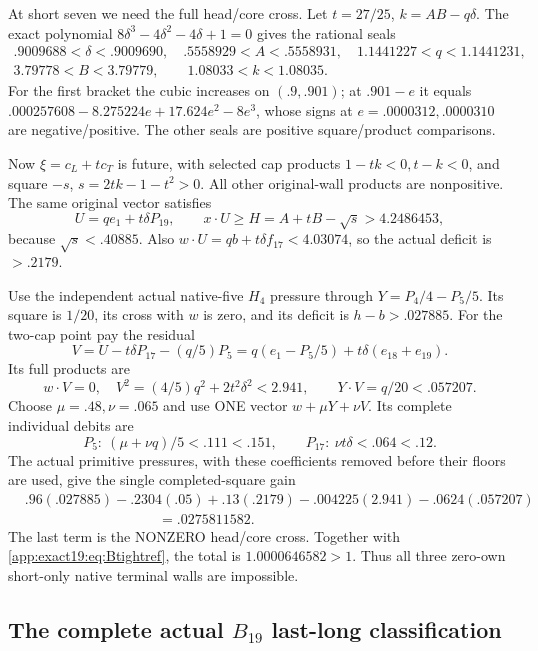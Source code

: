 \documentclass[11pt]{article}
\theoremstyle{definition}
\theoremstyle{remark}
\begin{document}
At short seven we need the full
head/core cross.
Let \(t=27/25\), \(k=AB-q\delta\).
The exact polynomial
\(8\delta^3-4\delta^2-4\delta+1=0\)
gives the rational seals
\[
\begin{gathered}
 .9009688<\delta<.9009690,\quad
 .5558929<A<.5558931,\quad
 1.1441227<q<1.1441231,\\
 3.79778<B<3.79779,\qquad1.08033<k<1.08035 .
\end{gathered}
\]
For the first bracket the cubic
increases on \((.9,.901)\);
at \(.901-e\) it equals
\(.000257608-8.275224e+17.624e^2-8e^3\),
whose signs at \(e=.0000312,.0000310\)
are negative/positive.
The other seals are positive
square/product comparisons.

Now \(\xi=c_L+t c_T\) is future,
with selected cap products
\(1-tk<0,t-k<0\), and square
\(-s\), \(s=2tk-1-t^2>0\).
All other original-wall products
are nonpositive.
The same original vector satisfies
\[
 U=qe_1+t\delta P_{19},\qquad
 x\cdot U\ge H=A+tB-\sqrt s>4.2486453 ,
\]
because \(\sqrt s<.40885\).
Also \(w\cdot U=qb+t\delta f_{17}<4.03074\),
so the actual deficit is \(>.2179\).

Use the independent actual native-five
\(H_4\) pressure through
\(Y=P_4/4-P_5/5\).
Its square is \(1/20\), its cross
with \(w\) is zero, and its deficit
is \(h-b>.027885\).
For the two-cap point pay the
residual
\[
 V=U-t\delta P_{17}-(q/5)P_5
        =q(e_1-P_5/5)+t\delta(e_{18}+e_{19}).
\]
Its full products are
\[
 w\cdot V=0,\quad
 V^2=(4/5)q^2+2t^2\delta^2<2.941,\qquad
                         Y\cdot V=q/20<.057207 .
\]
Choose \(\mu=.48,\nu=.065\)
and use ONE vector \(w+\mu Y+\nu V\).
Its complete individual debits are
\[
        P_5:\ (\mu+\nu q)/5<.111<.151,\qquad
        P_{17}:\ \nu t\delta<.064<.12 .
\]
The actual primitive pressures,
with these coefficients removed
before their floors are used,
give the single completed-square
gain
\[
\begin{split}
 &.96(.027885)-.2304(.05)
  +.13(.2179)-.004225(2.941)-.0624(.057207)\\
 &\hspace{4cm}=.0275811582 .
\end{split}
\]
The last term is the NONZERO
head/core cross.
Together with
\eqref{app:exact19:eq:Btightref},
the total is \(1.0000646582>1\).
Thus all three zero-own short-only
native terminal walls are impossible.


\subsection{The complete actual \(B_{19}\) last-long classification}
\label{app:exact19:Blastlong}
\end{document}
